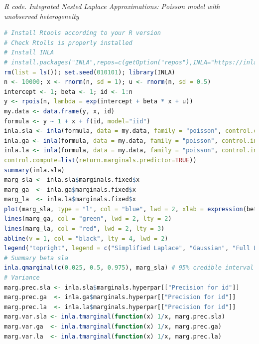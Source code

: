 \begin{tcolorbox}[enhanced,width=4.67in,center upper,
	fontupper=\large\bfseries,drop shadow southwest,sharp corners]
	\textit{R code. Integrated Nested Laplace Approximations: Poisson model with unobserved heterogeneity}
	\begin{VF}
		\begin{lstlisting}[language=R]
# Install Rtools according to your R version
# Check Rtolls is properly installed
# Install INLA
# install.packages("INLA",repos=c(getOption("repos"),INLA="https://inla.r-inla-download.org/R/stable"), dep=TRUE)
rm(list = ls()); set.seed(010101); library(INLA)
n <- 10000; x <- rnorm(n, sd = 1); u <- rnorm(n, sd = 0.5)
intercept <- 1; beta <- 1; id <- 1:n
y <- rpois(n, lambda = exp(intercept + beta * x + u))
my.data <- data.frame(y, x, id)
formula <- y ~ 1 + x + f(id, model="iid")
inla.sla <- inla(formula, data = my.data, family = "poisson", control.compute=list(return.marginals.predictor=TRUE))
inla.ga <- inla(formula, data = my.data, family = "poisson", control.inla = list(strategy = "gaussian", int.strategy = "eb"), control.compute=list(return.marginals.predictor=TRUE))
inla.la <- inla(formula, data = my.data, family = "poisson", control.inla = list(strategy = "laplace", int.strategy = "grid", dz=0.1, diff.logdens=20),
control.compute=list(return.marginals.predictor=TRUE))
summary(inla.sla)
marg_sla <- inla.sla$marginals.fixed$x
marg_ga  <- inla.ga$marginals.fixed$x
marg_la  <- inla.la$marginals.fixed$x
plot(marg_sla, type = "l", col = "blue", lwd = 2, xlab = expression(beta[x]), ylab = "Density", main = "Posterior of slope under different INLA strategies")
lines(marg_ga, col = "green", lwd = 2, lty = 2)
lines(marg_la, col = "red", lwd = 2, lty = 3)
abline(v = 1, col = "black", lty = 4, lwd = 2)
legend("topright", legend = c("Simplified Laplace", "Gaussian", "Full Laplace", "True = 1"), col = c("blue", "green", "red", "black"), lwd = 2, lty = c(1, 2, 3, 4), bty = "n")
# Summary beta sla
inla.qmarginal(c(0.025, 0.5, 0.975), marg_sla) # 95% credible interval
# Variance
marg.prec.sla <- inla.sla$marginals.hyperpar[["Precision for id"]]
marg.prec.ga  <- inla.ga$marginals.hyperpar[["Precision for id"]]
marg.prec.la  <- inla.la$marginals.hyperpar[["Precision for id"]]
marg.var.sla <- inla.tmarginal(function(x) 1/x, marg.prec.sla)
marg.var.ga  <- inla.tmarginal(function(x) 1/x, marg.prec.ga)
marg.var.la  <- inla.tmarginal(function(x) 1/x, marg.prec.la)
\end{lstlisting}
	\end{VF}
\end{tcolorbox}

